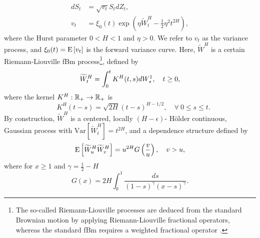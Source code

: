 \begin{align}\label{eq:rBergomi_model1}
	dS_t &= \sqrt{v_t} S_t dZ_t, \nonumber \\
	v_t &= \xi_0(t) \exp\left( \eta \widetilde{W}_t^H - \frac{1}{2} \eta^2 t^{2H} \right),
\end{align}
where the Hurst parameter $0 < H < 1$  and  $\eta>0$. We refer to $v_t$ as the variance process, and $\xi_0(t) = \mathrm{E}\left[v_t\right]$ is  the forward variance curve.  Here, $\widetilde{W}^H $ is a certain Riemann-Liouville fBm
process\footnote{The so-called Riemann-Liouville processes are deduced from the standard Brownian motion by applying Riemann-Liouville fractional operators, whereas the standard fBm requires a weighted fractional operator \cite{marinucci1999alternative,picard2011representation}.},  defined by
\begin{align}\label{eq:Volterra process}
	\widetilde{W}_t^H = \int_0^t K^H(t,s) dW_s^1, \quad t \ge 0 ,
\end{align}
where the kernel $K^H : \mathbb{R}_+  \rightarrow \mathbb{R}_+$ is
\begin{equation}\label{eq:kernel_rbergomi}
 \quad K^H(t-s) = \sqrt{2H} (t-s)^{H - 1/2},\quad \forall \: 0 \le s \le t.
\end{equation}
By construction, $\widetilde{W}^H $ is a centered, locally $(H-\epsilon)$- H\"older continuous, Gaussian process with $\text{Var}\left[\widetilde{W}^H_t \right] = t^{2H}$, and a dependence structure defined by 
 \begin{equation*}
 \mathrm{E}\left[\widetilde{W}^H_u  \widetilde{W}^H_v\right]=u^{2H} G\left(\frac{v}{u} \right),\quad v >u ,
 \end{equation*}
 where for $x \ge 1$ and $\gamma=\frac{1}{2}-H$
 \begin{equation}\label{eq:correlation_tilde_W_fun}
G(x)=2H \int_{0}^1 \frac{ds}{(1-s)^{\gamma} (x-s)^{\gamma}}.
 \end{equation}
%

